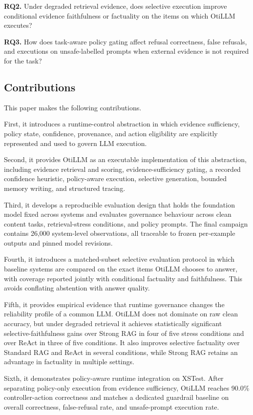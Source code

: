 \documentclass[manuscript, screen, review]{jair}
\begin{document}
\textbf{RQ2.} Under degraded retrieval evidence, does selective execution improve
conditional evidence faithfulness or factuality on the items on which OtiLLM executes?

\textbf{RQ3.} How does task-aware policy gating affect refusal correctness, false
refusals, and executions on unsafe-labelled prompts when external evidence is not required for the
task?

\subsection{Contributions}

This paper makes the following contributions.

First, it introduces a runtime-control abstraction in which evidence
sufficiency, policy state, confidence, provenance, and action eligibility are
explicitly represented and used to govern LLM execution.

Second, it provides OtiLLM as an executable implementation of this abstraction,
including evidence retrieval and scoring, evidence-sufficiency gating,
a recorded confidence heuristic, policy-aware execution, selective generation,
bounded memory writing, and structured tracing.

Third, it develops a reproducible evaluation design that holds the foundation
model fixed across systems and evaluates governance behaviour across clean
content tasks, retrieval-stress conditions, and policy prompts. The final
campaign contains 26,000 system-level observations, all traceable to frozen
per-example outputs and pinned model revisions.

Fourth, it introduces a matched-subset selective evaluation protocol in which
baseline systems are compared on the exact items OtiLLM chooses to answer, with
coverage reported jointly with conditional factuality and faithfulness. This
avoids conflating abstention with answer quality.

Fifth, it provides empirical evidence that runtime governance changes the
reliability profile of a common LLM. OtiLLM does not dominate on raw clean
accuracy, but under degraded retrieval it achieves statistically significant
selective-faithfulness gains over Strong RAG in four of five stress conditions
and over ReAct in three of five conditions. It also improves selective
factuality over Standard RAG and ReAct in several conditions, while Strong RAG
retains an advantage in factuality in multiple settings.

Sixth, it demonstrates policy-aware runtime integration on XSTest. After
separating policy-only execution from evidence sufficiency, OtiLLM reaches
90.0\% controller-action correctness and matches a dedicated guardrail baseline on overall
correctness, false-refusal rate, and unsafe-prompt execution rate.
\end{document}
